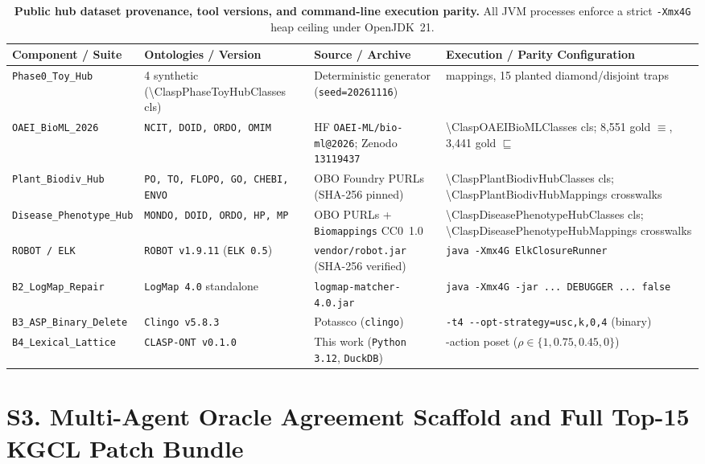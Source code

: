\documentclass[10pt]{article}
\theoremstyle{accentthm}
\begin{document}
\begin{table}[htbp]
\centering
\caption{\textbf{Public hub dataset provenance, tool versions, and command-line execution parity.} All JVM processes enforce a strict \texttt{-Xmx4G} heap ceiling under OpenJDK~21.}
\label{tab:s1_provenance}
\footnotesize
\setlength{\tabcolsep}{4.2pt}
\begin{tabularx}{\textwidth}{@{}ll>{\raggedright\arraybackslash}X>{\raggedright\arraybackslash}X@{}}
\toprule
\textbf{Component / Suite} & \textbf{Ontologies / Version} & \textbf{Source / Archive} & \textbf{Execution / Parity Configuration} \\
\midrule
\texttt{Phase0\_Toy\_Hub} & 4 synthetic (\num{\ClaspPhaseToyHubClasses} cls) & Deterministic generator (\texttt{seed=20261116}) & 60 mappings, 15 planted diamond/disjoint traps \\
\texttt{OAEI\_BioML\_2026} & \texttt{NCIT, DOID, ORDO, OMIM} & HF \texttt{OAEI-ML/bio-ml@2026}; Zenodo \texttt{13119437} & \num{\ClaspOAEIBioMLClasses} cls; 8,551 gold $\equiv$, 3,441 gold $\sqsubseteq$ \\
\texttt{Plant\_Biodiv\_Hub} & \texttt{PO, TO, FLOPO, GO, CHEBI, ENVO} & OBO Foundry PURLs (SHA-256 pinned) & \num{\ClaspPlantBiodivHubClasses} cls; \num{\ClaspPlantBiodivHubMappings} crosswalks \\
\texttt{Disease\_Phenotype\_Hub} & \texttt{MONDO, DOID, ORDO, HP, MP} & OBO PURLs + \texttt{Biomappings} CC0~1.0 & \num{\ClaspDiseasePhenotypeHubClasses} cls; \num{\ClaspDiseasePhenotypeHubMappings} crosswalks \\
\addlinespace[3pt]
\texttt{ROBOT / ELK} & \texttt{ROBOT v1.9.11} (\texttt{ELK 0.5}) & \texttt{vendor/robot.jar} (SHA-256 verified) & \texttt{java -Xmx4G ElkClosureRunner} \\
\texttt{B2\_LogMap\_Repair} & \texttt{LogMap 4.0} standalone & \texttt{logmap-matcher-4.0.jar} & \texttt{java -Xmx4G -jar ... DEBUGGER ... false} \\
\texttt{B3\_ASP\_Binary\_Delete} & \texttt{Clingo v5.8.3} & Potassco (\texttt{clingo}) & \texttt{-t4 -{}-opt-strategy=usc,k,0,4} (binary) \\
\texttt{B4\_Lexical\_Lattice} & \texttt{CLASP-ONT v0.1.0} & This work (\texttt{Python 3.12}, \texttt{DuckDB}) & 5-action poset ($\rho \in \{1, 0.75, 0.45, 0\}$) \\
\bottomrule
\end{tabularx}
\end{table}

\section*{S3. Multi-Agent Oracle Agreement Scaffold and Full Top-15 KGCL Patch Bundle}
\end{document}
